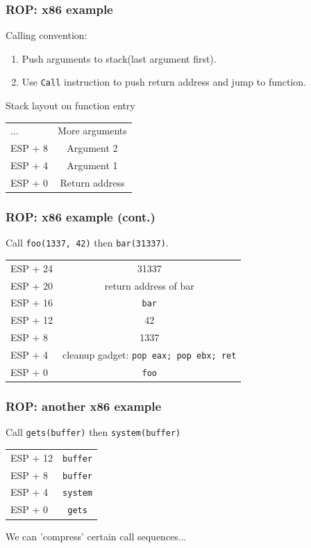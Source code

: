 \documentclass{beamer}
\begin{document}
\begin{frame}
    \frametitle{ROP: x86 example}

    \pause Calling convention:
    \begin{enumerate}
        \item Push arguments to stack(last argument first).
        \item Use \texttt{Call} instruction to push return address and jump to function.
    \end{enumerate}
    
    \pause Stack layout on function entry
    \begin{center}
    \begin{tabular}{l|c}
        ...     & More arguments \\
        ESP + 8 & Argument 2 \\
        ESP + 4 & Argument 1 \\
        ESP + 0 & Return address \\
    \end{tabular}
    \end{center}
\end{frame}


\begin{frame}
    \frametitle{ROP: x86 example (cont.)}
    Call \texttt{foo(1337, 42)} then \texttt{bar(31337)}.
    \pause
    \begin{center}
    \begin{tabular}{l|c}
        ESP + 24 & 31337 \\
        ESP + 20 & return address of bar \\
        ESP + 16 & \texttt{bar} \\
        ESP + 12 & 42 \\
        ESP + 8  & 1337 \\
        ESP + 4  & cleanup gadget: \texttt{pop eax; pop ebx; ret} \\
        ESP + 0  & \texttt{foo}
    \end{tabular}
    \end{center}
\end{frame}


\begin{frame}
    \frametitle{ROP: another x86 example}
    Call \texttt{gets(buffer)} then \texttt{system(buffer)}
    \pause
    \begin{center}
    \begin{tabular}{l|c}
        ESP + 12 & \texttt{buffer} \\
        ESP + 8  & \texttt{buffer} \\
        ESP + 4  & \texttt{system} \\
        ESP + 0  & \texttt{gets}
    \end{tabular}
    \end{center}
    \pause We can 'compress' certain call sequences...
\end{frame}
\end{document}
